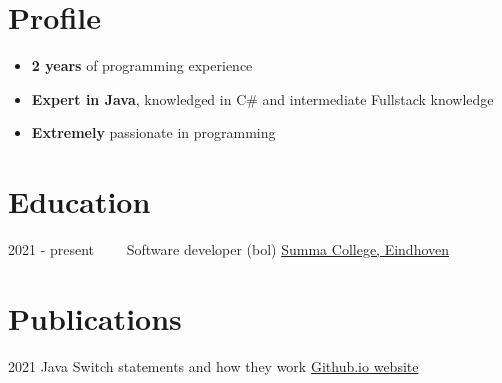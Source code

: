 \documentclass[letterpaper]{twentysecondcv} %
\begin{document}
\makesidebarFirst %

\section{Profile}

\begin{itemize}
	\item \textbf{2 years} of programming experience
	\item \textbf{Expert in Java}, knowledged in C\# and intermediate Fullstack knowledge
	\item \textbf{Extremely} passionate in programming
\end{itemize}

\vspace{6mm}


\section{Education}

\begin{twenty} %
	\twentyitem
    	{2021 - present~~~~}
        {}
        {Software developer (bol)}
        {\href{https://www.summacollege.nl/}{Summa College, Eindhoven}}
        {}
        {}
\end{twenty}



\section{Publications}
\begin{twenty} %
	\twentyitem
    		{2021}
		        {}
        		{Java Switch statements and how they work}
        		{\href{https://tais993.github.io/article}{Github.io website}}
        		{}
        		{}
\end{twenty}
\end{document}
